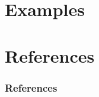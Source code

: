 \documentclass[10pt,t]{beamer}
\begin{document}
\section{Examples}


\section*{References}

\begin{frame}[allowframebreaks]
	\frametitle{References}
	\nocite{whitney1935history}
	
	
\end{frame}
\end{document}
